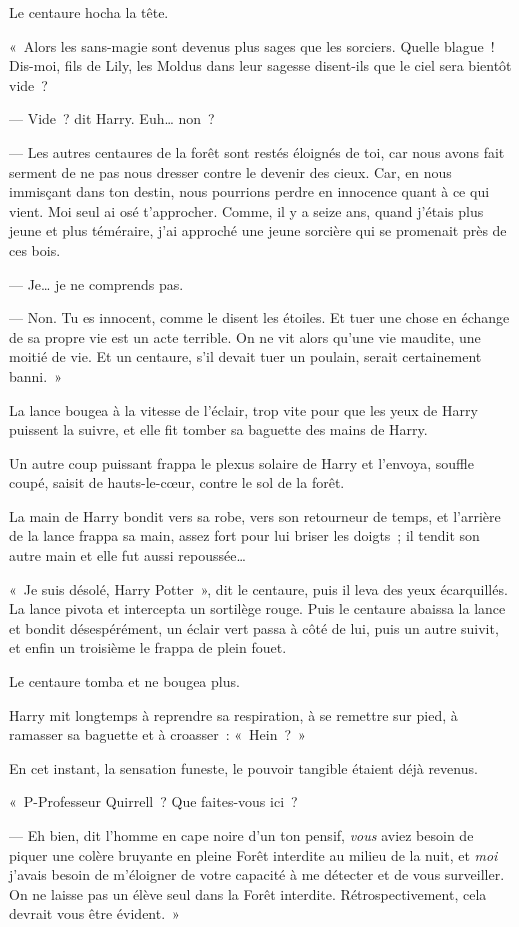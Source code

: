 Le centaure hocha la tête.

«~Alors les sans-magie sont devenus plus sages que les sorciers.
Quelle blague~!
Dis-moi, fils de Lily, les Moldus dans leur sagesse disent-ils que le ciel sera bientôt vide~?

--- Vide~? dit Harry.
Euh… non~?

--- Les autres centaures de la forêt sont restés éloignés de toi, car nous avons fait serment de ne pas nous dresser contre le devenir des cieux.
Car, en nous immisçant dans ton destin, nous pourrions perdre en innocence quant à ce qui vient.
Moi seul ai osé t'approcher.
Comme, il y a seize ans, quand j'étais plus jeune et plus téméraire, j'ai approché une jeune sorcière qui se promenait près de ces bois.

--- Je… je ne comprends pas.

--- Non.
Tu es innocent, comme le disent les étoiles.
Et tuer une chose en échange de sa propre vie est un acte terrible.
On ne vit alors qu'une vie maudite, une moitié de vie.
Et un centaure, s'il devait tuer un poulain, serait certainement banni.~»

La lance bougea à la vitesse de l'éclair, trop vite pour que les yeux de Harry puissent la suivre, et elle fit tomber sa baguette des mains de Harry.

Un autre coup puissant frappa le plexus solaire de Harry et l'envoya, souffle coupé, saisit de hauts-le-cœur, contre le sol de la forêt.

La main de Harry bondit vers sa robe, vers son retourneur de temps, et l'arrière de la lance frappa sa main, assez fort pour lui briser les doigts~; il tendit son autre main et elle fut aussi repoussée…

«~Je suis désolé, Harry Potter~», dit le centaure, puis il leva des yeux écarquillés.
La lance pivota et intercepta un sortilège rouge.
Puis le centaure abaissa la lance et bondit désespérément, un éclair vert passa à côté de lui, puis un autre suivit, et enfin un troisième le frappa de plein fouet.

Le centaure tomba et ne bougea plus.

Harry mit longtemps à reprendre sa respiration, à se remettre sur pied, à ramasser sa baguette et à croasser~: «~Hein~?~»

En cet instant, la sensation funeste, le pouvoir tangible étaient déjà revenus.

«~P-Professeur Quirrell~?
Que faites-vous ici~?

--- Eh bien, dit l'homme en cape noire d'un ton pensif, \emph{vous} aviez besoin de piquer une colère bruyante en pleine Forêt interdite au milieu de la nuit, et \emph{moi} j'avais besoin de m'éloigner de votre capacité à me détecter et de vous surveiller.
On ne laisse pas un élève seul dans la Forêt interdite.
Rétrospectivement, cela devrait vous être évident.~»

